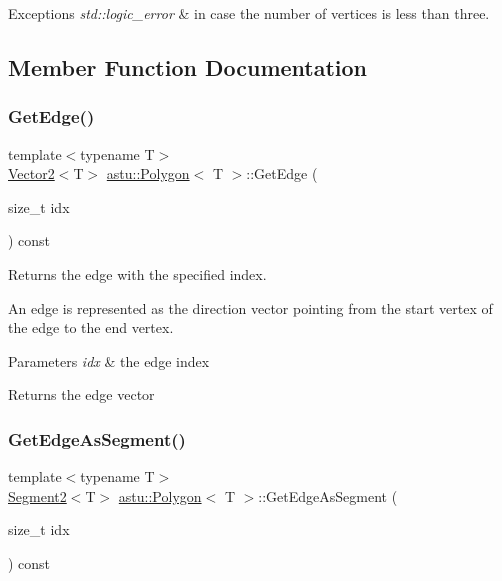 \begin{DoxyExceptions}{Exceptions}
{\em std\+::logic\+\_\+error} & in case the number of vertices is less than three. \\
\hline
\end{DoxyExceptions}


\subsection{Member Function Documentation}
\mbox{\label{classastu_1_1Polygon_ac947a4d49a9b43c76169559c4475ef96}} 
\subsubsection{\texorpdfstring{Get\+Edge()}{GetEdge()}}
{\footnotesize\ttfamily template$<$typename T$>$ \\
\hyperlink{classastu_1_1Vector2}{Vector2}$<$T$>$ \hyperlink{classastu_1_1Polygon}{astu\+::\+Polygon}$<$ T $>$\+::Get\+Edge (\begin{DoxyParamCaption}\item[{size\+\_\+t}]{idx }\end{DoxyParamCaption}) const\hspace{0.3cm}{\ttfamily [inline]}}

Returns the edge with the specified index.

An edge is represented as the direction vector pointing from the start vertex of the edge to the end vertex.


\begin{DoxyParams}{Parameters}
{\em idx} & the edge index \\
\hline
\end{DoxyParams}
\begin{DoxyReturn}{Returns}
the edge vector 
\end{DoxyReturn}
\mbox{\label{classastu_1_1Polygon_af52218667a41061353fb5b98b858d1da}} 
\subsubsection{\texorpdfstring{Get\+Edge\+As\+Segment()}{GetEdgeAsSegment()}}
{\footnotesize\ttfamily template$<$typename T$>$ \\
\hyperlink{classastu_1_1Segment2}{Segment2}$<$T$>$ \hyperlink{classastu_1_1Polygon}{astu\+::\+Polygon}$<$ T $>$\+::Get\+Edge\+As\+Segment (\begin{DoxyParamCaption}\item[{size\+\_\+t}]{idx }\end{DoxyParamCaption}) const\hspace{0.3cm}{\ttfamily [inline]}}

